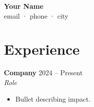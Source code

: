 \documentclass[letterpaper,11pt]{article}
\begin{document}
\begin{center}
  {\LARGE \textbf{Your Name}} \\[2pt]
  email · phone · city
\end{center}

\section*{Experience}
\textbf{Company} \hfill 2024 -- Present \\
\textit{Role}
\begin{itemize}
  \item Bullet describing impact.
\end{itemize}
\end{document}
